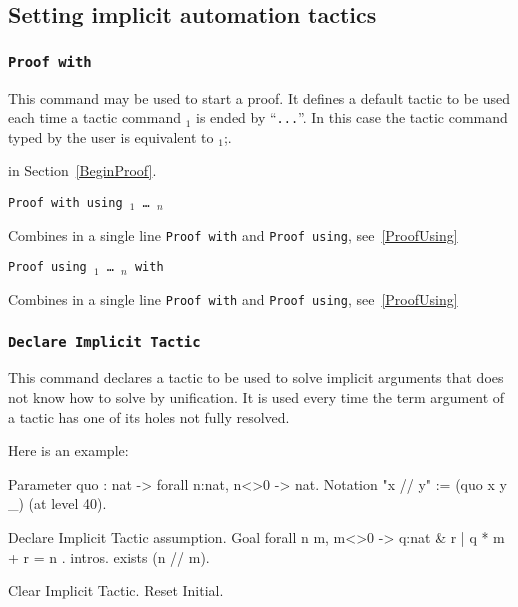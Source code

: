 \begin{coq_example*}
\subsection{Setting implicit automation tactics}

\subsubsection{\tt Proof with {\tac}}
\label{ProofWith}

  This command may be used to start a proof. It defines a default
  tactic to be used each time a tactic command {\tac$_1$} is ended by
  ``\verb#...#''. In this case the tactic command typed by the user is
  equivalent to \tac$_1$;{\tac}.

 in Section~\ref{BeginProof}.

\begin{Variants}

\item {\tt Proof with {\tac} using \ident$_1$ \mbox{\dots} \ident$_n$}

  Combines in a single line {\tt Proof with} and {\tt Proof using},
  see~\ref{ProofUsing}

\item {\tt Proof using \ident$_1$ \mbox{\dots} \ident$_n$ with {\tac}}

  Combines in a single line {\tt Proof with} and {\tt Proof using},
  see~\ref{ProofUsing}

\end{Variants}

\subsubsection{\tt Declare Implicit Tactic {\tac}}\label{DeclareImplicit}

This command declares a tactic to be used to solve implicit arguments
that {\Coq} does not know how to solve by unification. It is used
every time the term argument of a tactic has one of its holes not
fully resolved.

Here is an example:

\begin{coq_example}
Parameter quo : nat -> forall n:nat, n<>0 -> nat.
Notation "x // y" := (quo x y _) (at level 40).

Declare Implicit Tactic assumption.
Goal forall n m, m<>0 -> { q:nat & { r | q * m + r = n } }.
intros.
exists (n // m).
\end{coq_example}
\begin{coq_eval}
Clear Implicit Tactic.
Reset Initial.
\end{coq_eval}


\end{coq_example*}
